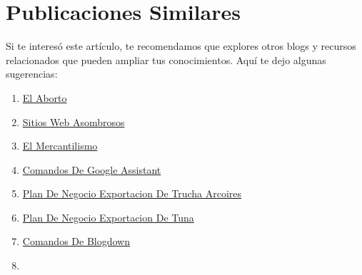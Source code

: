 \documentclass[
  stu,
  floatsintext,
  longtable,
  a4paper,
  nolmodern,
  notxfonts,
  notimes,
  colorlinks=true,linkcolor=blue,citecolor=blue,urlcolor=blue]{apa7}
\providecommand{\tightlist}{%
  \setlength{\itemsep}{0pt}\setlength{\parskip}{0pt}}
\begin{document}
\section{Publicaciones Similares}\label{publicaciones-similares}

Si te interesó este artículo, te recomendamos que explores otros blogs y
recursos relacionados que pueden ampliar tus conocimientos. Aquí te dejo
algunas sugerencias:

\begin{enumerate}
\def\labelenumi{\arabic{enumi}.}
\tightlist
\item
  \href{https://achalmaedison.netlify.app/blog/posts/2015-05-14-el-aborto/index.pdf}{}
  \href{https://achalmaedison.netlify.app/blog/posts/2015-05-14-el-aborto}{El
  Aborto}
\item
  \href{https://achalmaedison.netlify.app/blog/posts/2017-04-23-sitios-web-asombrosos/index.pdf}{}
  \href{https://achalmaedison.netlify.app/blog/posts/2017-04-23-sitios-web-asombrosos}{Sitios
  Web Asombrosos}
\item
  \href{https://achalmaedison.netlify.app/blog/posts/2017-05-23-el-mercantilismo/index.pdf}{}
  \href{https://achalmaedison.netlify.app/blog/posts/2017-05-23-el-mercantilismo}{El
  Mercantilismo}
\item
  \href{https://achalmaedison.netlify.app/blog/posts/2020-05-23-comandos-de-google-assistant/index.pdf}{}
  \href{https://achalmaedison.netlify.app/blog/posts/2020-05-23-comandos-de-google-assistant}{Comandos
  De Google Assistant}
\item
  \href{https://achalmaedison.netlify.app/blog/posts/2020-09-15-plan-de-negocio-exportacion-de-trucha-arcoires/index.pdf}{}
  \href{https://achalmaedison.netlify.app/blog/posts/2020-09-15-plan-de-negocio-exportacion-de-trucha-arcoires}{Plan
  De Negocio Exportacion De Trucha Arcoires}
\item
  \href{https://achalmaedison.netlify.app/blog/posts/2021-07-13-plan-de-negocio-exportacion-de-tuna/index.pdf}{}
  \href{https://achalmaedison.netlify.app/blog/posts/2021-07-13-plan-de-negocio-exportacion-de-tuna}{Plan
  De Negocio Exportacion De Tuna}
\item
  \href{https://achalmaedison.netlify.app/blog/posts/2021-07-14-comandos-de-blogdown/index.pdf}{}
  \href{https://achalmaedison.netlify.app/blog/posts/2021-07-14-comandos-de-blogdown}{Comandos
  De Blogdown}
\item

\end{enumerate}
\end{document}

